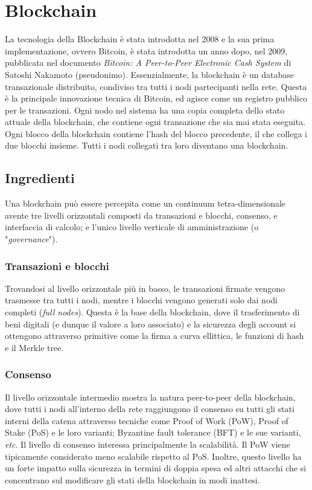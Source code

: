 \section{Blockchain}
La tecnologia della Blockchain è stata introdotta nel 2008 e la sua prima implementazione, ovvero Bitcoin, è stata introdotta un anno dopo, nel 2009, pubblicata nel documento \emph{Bitcoin: A Peer-to-Peer Electronic Cash System} \cite{c21} di Satoshi Nakamoto (pseudonimo). Essenzialmente, la blockchain è un database transazionale distribuito, condiviso tra tutti i nodi partecipanti nella rete. Questa è la principale innovazione tecnica di Bitcoin, ed agisce come un registro pubblico per le transazioni. Ogni nodo nel sistema ha una copia completa dello stato attuale della blockchain, che contiene ogni transazione che sia mai stata eseguita. Ogni blocco della blockchain contiene l'hash del blocco precedente, il che collega i due blocchi insieme. Tutti i nodi collegati tra loro diventano una blockchain.

\subsection{Ingredienti}
Una blockchain può essere percepita come un continuum tetra-dimensionale avente tre livelli orizzontali composti da transazioni e blocchi, consenso, e interfaccia di calcolo; e l'unico livello verticale di amministrazione (o "\emph{governance}").

\subsubsection{Transazioni e blocchi}
Trovandosi al livello orizzontale più in basso, le transazioni firmate vengono trasmesse tra tutti i nodi, mentre i blocchi vengono generati solo dai nodi completi (\emph{full nodes}). Questa è la base della blockchain, dove il trasferimento di beni digitali (e dunque il valore a loro associato) e la sicurezza degli account si ottengono attraverso primitive come la firma a curva ellittica, le funzioni di hash e il Merkle tree.

\subsubsection{Consenso}
Il livello orizzontale intermedio mostra la natura peer-to-peer della blockchain, dove tutti i nodi all'interno della rete raggiungono il consenso su tutti gli stati interni della catena attraverso tecniche come Proof of Work (PoW), Proof of Stake (PoS) e le loro varianti; Byzantine fault tolerance (BFT) e le sue varianti, \emph{etc}. Il livello di consenso interessa principalmente la scalabilità. Il PoW viene tipicamente considerato meno scalabile rispetto al PoS. Inoltre, questo livello ha un forte impatto sulla sicurezza in termini di doppia spesa ed altri attacchi che si concentrano sul modificare gli stati della blockchain in modi inattesi.

